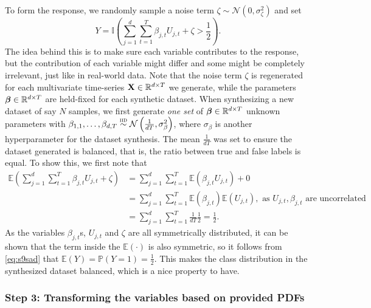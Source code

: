 \documentclass{statsmsc}
\begin{document}
{To form the response, we randomly sample a noise term $\zeta \sim \mathcal{N}(0,\sigma_\zeta^2)$
and set
\begin{equation}
    Y=\mathbb{I}\left(\sum^{d}_{j=1} \sum^{T}_{t=1} \beta_{j,t} U_{j,t}+\zeta > \frac{1}{2}  \right).
\end{equation}
The idea behind this is to make sure each variable contributes to the response, but the contribution
of each variable might differ and some might be completely irrelevant, just like in real-world
data.
Note that the noise term $\zeta$ 
is regenerated for each multivariate time-series $\mathbf{X} \in \mathbb{R}^{d \times T}$
we generate, while the
parameters $\bm\beta \in \mathbb{R}^{d \times T}$ are held-fixed for each synthetic dataset.
When synthesizing a new dataset of say $N$ samples, we first generate \textit{one set} of
$\bm\beta \in \mathbb{R}^{d \times T}$ unknown parameters with
$\beta_{1,1},\dots,\beta_{d,T} \stackrel{\textsc{iid}}{\sim} \mathcal{N}\left(\frac{1}{dT},\sigma_{\beta}^2\right)$, where
$\sigma_\beta$ is another hyperparameter for the dataset synthesis. The mean $\frac{1}{dT}$
was set to
ensure the dataset generated is balanced, that is, the ratio between true and false labels is equal.
To show this, we first note that
\begin{align}
    \mathbb{E}\left(
        \sum^{d}_{j=1} \sum^{T}_{t=1} \beta_{j,t} U_{j,t}+\zeta
    \right)
    &=\sum^{d}_{j=1} \sum^{T}_{t=1}  \mathbb{E}\left(\beta_{j,t} U_{j,t} \right)+0 \nonumber\\
    &=\sum^{d}_{j=1} \sum^{T}_{t=1}  \mathbb{E}\left(\beta_{j,t}\right)
    \mathbb{E}\left(U_{j,t} \right), \textrm{ as } U_{j,t}, \beta_{j,t}\textrm{ are uncorrelated}\nonumber \\
    &=\sum^{d}_{j=1} \sum^{T}_{t=1} \frac{1}{dT} \frac{1}{2} =\frac{1}{2} \label{eq:s9sad}.
\end{align}
As the variables $\beta_{j,t}$s, $U_{j,t}$ and $\zeta$ are all symmetrically distributed, it can
be shown that the term inside the $\mathbb{E}(\cdot)$ is also symmetric, so it follows from
\cref{eq:s9sad} that $\mathbb{E}(Y)=\mathbb{P}(Y=1)=\frac{1}{2}$. This makes the class distribution in the
synthesized dataset balanced, which is a nice property to have.

\subsubsection{Step 3: Transforming the variables based on provided PDFs}%
\label{ssub:Step 3: Estimating the inverse CDF}

}
\end{document}
